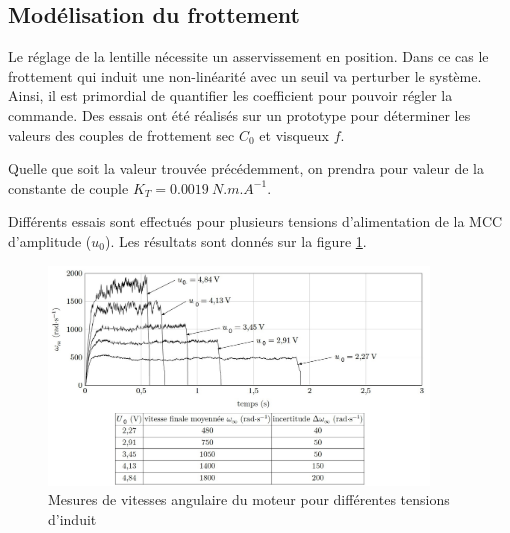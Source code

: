 \subsection{Modélisation du frottement}

Le réglage de la lentille nécessite un asservissement en position. Dans ce cas le frottement qui induit une non-linéarité avec un seuil va perturber le système. Ainsi, il est primordial de quantifier les coefficient pour pouvoir
régler la commande. Des essais ont été réalisés sur un prototype pour déterminer les valeurs des couples de
frottement sec $C_0$ et visqueux $f$.

Quelle que soit la valeur trouvée précédemment, on prendra pour valeur de la constante de couple $K_T= \SI{0,0019}{N. m. A^{-1}}$.

Différents essais sont effectués pour plusieurs tensions d'alimentation de la MCC d'amplitude ($u_0$). Les résultats sont donnés sur
la figure \ref{fig13}.

\begin{figure}[!htb]
\begin{center}
\includegraphics[width=0.9\textwidth]{images/image_fig13.jpg}
\caption{Mesures de vitesses angulaire du moteur pour différentes tensions d’induit \label{fig13}}
\end{center}
\end{figure}

